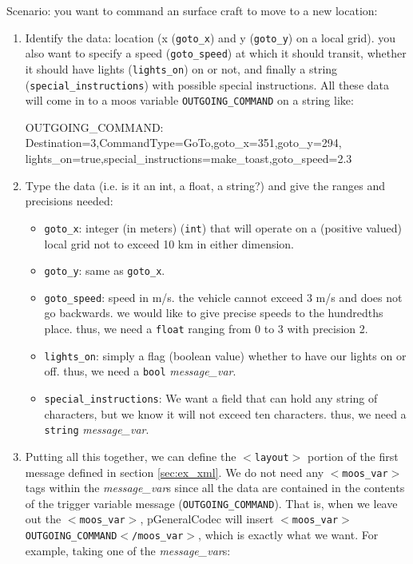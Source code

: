 \documentclass[11pt, letterpaper, oneside]{memoir}
\newcommand{\xmltag}[1]{\texttt{$<$#1$>$}}
\begin{document}
Scenario: you want to command an surface craft to move to a new location:
\begin{enumerate}
\item Identify the data: location (x (\verb|goto_x|) and y (\verb|goto_y|) on a local grid). you also want to specify a speed (\verb|goto_speed|) at which it should transit, whether it should have lights (\verb|lights_on|) on or not, and finally a string (\verb|special_instructions|) with possible special instructions. All these data will come in to a moos variable \verb|OUTGOING_COMMAND| on a string like: 
\begin{small}
\begin{boxedverbatim}
OUTGOING_COMMAND: Destination=3,CommandType=GoTo,goto_x=351,goto_y=294,
                  lights_on=true,special_instructions=make_toast,goto_speed=2.3
\end{boxedverbatim}
\resetbvlinenumber
\end{small}
\item Type the data (i.e. is it an int, a float, a string?) and give the ranges and precisions needed: 
\begin{itemize}
\item \verb|goto_x|: integer (in meters) (\verb|int|) that will operate on a (positive valued) local grid not to exceed 10 km in either dimension. 
\item \verb|goto_y|: same as \verb|goto_x|.
\item \verb|goto_speed|: speed in m/s. the vehicle cannot exceed 3 m/s and does not go backwards. we would like to give precise speeds to the hundredths place. thus, we need a \verb|float| ranging from 0 to 3 with precision 2.
\item \verb|lights_on|: simply a flag (boolean value) whether to have our lights on or off. thus, we need a \verb|bool| \textit{message\_var}.
\item \verb|special_instructions|: We want a field that can hold any string of characters, but we know it will not exceed ten characters. thus, we need a \verb|string| \textit{message\_var}.
\end{itemize}
\item Putting all this together, we can define the \xmltag{layout} portion of the first message defined in section \ref{sec:ex_xml}. We do not need any \xmltag{moos\_var} tags within the \textit{message\_var}s since all the data are contained in the contents of the trigger variable message (\verb|OUTGOING_COMMAND|). That is, when we leave out the \xmltag{moos\_var}, pGeneralCodec will insert \xmltag{moos\_var$>$OUTGOING\_COMMAND$<$/moos\_var}, which is exactly what we want. For example, taking one of the \textit{message\_var}s:

\end{enumerate}
\end{document}
